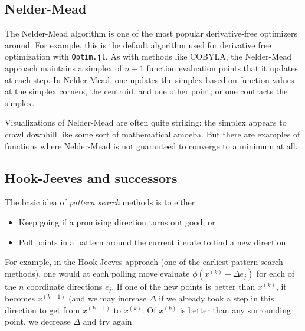 \documentclass[12pt, leqno]{article} %
\providecommand{\tightlist}{%
  \setlength{\itemsep}{0pt}\setlength{\parskip}{0pt}}
\begin{document}
\subsection{Nelder-Mead}

The Nelder-Mead algorithm is one of the most popular derivative-free
optimizers around. For example, this is the default algorithm used for
derivative free optimization with \texttt{Optim.jl}. As with methods
like COBYLA, the Nelder-Mead approach maintains a simplex of \(n+1\)
function evaluation points that it updates at each step. In Nelder-Mead,
one updates the simplex based on function values at the simplex corners,
the centroid, and one other point; or one contracts the simplex.

Visualizations of Nelder-Mead are often quite striking: the simplex
appears to crawl downhill like some sort of mathematical amoeba. But
there are examples of functions where Nelder-Mead is not guaranteed to
converge to a minimum at all.

\subsection{Hook-Jeeves and successors}

The basic idea of \emph{pattern search} methods is to either

\begin{itemize}
\tightlist
\item
  Keep going if a promising direction turns out good, or
\item
  Poll points in a pattern around the current iterate to find a new
  direction
\end{itemize}

For example, in the Hook-Jeeves approach (one of the earliest pattern
search methods), one would at each polling move evaluate
\(\phi(x^{(k)} \pm \Delta e_j)\) for each of the \(n\) coordinate
directions \(e_j\). If one of the new points is better than \(x^{(k)}\),
it becomes \(x^{(k+1)}\) (and we may increase \(\Delta\) if we already
took a step in this direction to get from \(x^{(k-1)}\) to \(x^{(k)}\).
Of \(x^{(k)}\) is better than any surrounding point, we decrease
\(\Delta\) and try again.
\end{document}
